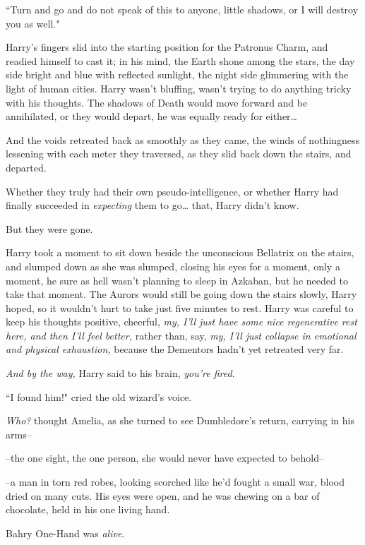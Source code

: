 ``Turn and go and do not speak of this to anyone, little shadows, or I will destroy you as well."

Harry's fingers slid into the starting position for the Patronus Charm, and readied himself to cast it; in his mind, the Earth shone among the stars, the day side bright and blue with reflected sunlight, the night side glimmering with the light of human cities. Harry wasn't bluffing, wasn't trying to do anything tricky with his thoughts. The shadows of Death would move forward and be annihilated, or they would depart, he was equally ready for either{\ldots}

And the voids retreated back as smoothly as they came, the winds of nothingness lessening with each meter they traversed, as they slid back down the stairs, and departed.

Whether they truly had their own pseudo-intelligence, or whether Harry had finally succeeded in \emph{expecting} them to go{\ldots} that, Harry didn't know.

But they were gone.

Harry took a moment to sit down beside the unconscious Bellatrix on the stairs, and slumped down as she was slumped, closing his eyes for a moment, only a moment, he sure as hell wasn't planning to sleep in Azkaban, but he needed to take that moment. The Aurors would still be going down the stairs slowly, Harry hoped, so it wouldn't hurt to take just five minutes to rest. Harry was careful to keep his thoughts positive, cheerful, \emph{my, I'll just have some nice regenerative rest here, and then I'll feel better,} rather than, say, \emph{my, I'll just collapse in emotional and physical exhaustion,} because the Dementors hadn't yet retreated very far.

\emph{And by the way,} Harry said to his brain, \emph{you're fired}.

\later

``I found him!" cried the old wizard's voice.

\emph{Who?} thought Amelia, as she turned to see Dumbledore's return, carrying in his arms\---

\---the one sight, the one person, she would never have expected to behold\---

\---a man in torn red robes, looking scorched like he'd fought a small war, blood dried on many cuts. His eyes were open, and he was chewing on a bar of chocolate, held in his one living hand.

Bahry One-Hand was \emph{alive}.

